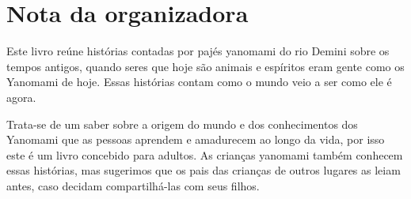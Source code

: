 
\chapter{Nota da organizadora}

Este livro reúne histórias contadas por pajés yanomami do rio Demini sobre os tempos antigos, quando seres que hoje são animais e espíritos eram gente como os Yanomami de hoje. Essas histórias contam como o mundo veio a ser como ele é agora.

Trata-se de um saber sobre a origem do mundo e dos conhecimentos dos Yanomami que as pessoas aprendem e amadurecem ao longo da vida, por isso este é um livro concebido para adultos. As crianças yanomami também conhecem essas histórias, mas sugerimos que os pais das crianças de outros lugares as leiam antes, caso decidam compartilhá-las com seus filhos.

